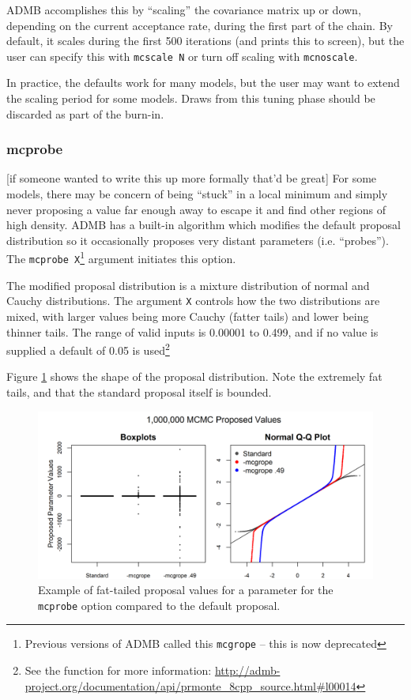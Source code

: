 \documentclass{article}\usepackage[]{graphicx}\usepackage[]{color}
\begin{document}
ADMB accomplishes this by ``scaling'' the covariance matrix
up or down, depending on the current acceptance rate, during
the first part of the chain. By default, it scales during
the first 500 iterations (and prints this to screen), but
the user can specify this with \texttt{mcscale N} or turn
off scaling with \texttt{mcnoscale}.

In practice, the defaults work for many models, but the user
may want to extend the scaling period for some models. Draws
from this tuning phase should be discarded as part of the
burn-in.
\subsubsection{mcprobe}\label{sec:mcprobe}
\large{[if someone wanted to write this up more formally
  that'd be great]}
For some models, there may be concern of being ``stuck'' in
a local minimum and simply never proposing a value far
enough away to escape it and find other regions of high
density. ADMB has a built-in algorithm which modifies the
default proposal distribution so it occasionally proposes
very distant parameters (i.e. ``probes''). The
\texttt{mcprobe X}\footnote{Previous versions of ADMB called
  this \texttt{mcgrope} -- this is now deprecated} argument
initiates this option.

The modified proposal distribution is a mixture distribution
of normal and Cauchy distributions. The argument \texttt{X}
controls how the two distributions are mixed, with larger
values being more Cauchy (fatter tails) and lower being
thinner tails. The range of valid inputs is 0.00001 to
0.499, and if no value is supplied a default of 0.05 is
used\footnote{See the function for more information:
  \url{http://admb-project.org/documentation/api/prmonte_8cpp_source.html#l00014}}

Figure \ref{fig:mcgrope_example} shows the shape of the
proposal distribution. Note the extremely fat tails, and
that the standard proposal itself is bounded.

\begin{figure}[h]
  \centering
  \includegraphics[width=5in]{../plots/mcgrope_example.png}
  \caption{Example of fat-tailed proposal values for a
    parameter for the \texttt{mcprobe} option compared to
    the default proposal.}
  \label{fig:mcgrope_example}
\end{figure}
\end{document}
